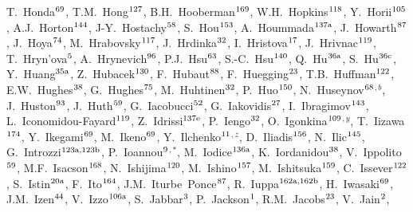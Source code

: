 \begin{flushleft}
T.~Honda$^\textrm{\scriptsize 69}$,
T.M.~Hong$^\textrm{\scriptsize 127}$,
B.H.~Hooberman$^\textrm{\scriptsize 169}$,
W.H.~Hopkins$^\textrm{\scriptsize 118}$,
Y.~Horii$^\textrm{\scriptsize 105}$,
A.J.~Horton$^\textrm{\scriptsize 144}$,
J-Y.~Hostachy$^\textrm{\scriptsize 58}$,
S.~Hou$^\textrm{\scriptsize 153}$,
A.~Hoummada$^\textrm{\scriptsize 137a}$,
J.~Howarth$^\textrm{\scriptsize 87}$,
J.~Hoya$^\textrm{\scriptsize 74}$,
M.~Hrabovsky$^\textrm{\scriptsize 117}$,
J.~Hrdinka$^\textrm{\scriptsize 32}$,
I.~Hristova$^\textrm{\scriptsize 17}$,
J.~Hrivnac$^\textrm{\scriptsize 119}$,
T.~Hryn'ova$^\textrm{\scriptsize 5}$,
A.~Hrynevich$^\textrm{\scriptsize 96}$,
P.J.~Hsu$^\textrm{\scriptsize 63}$,
S.-C.~Hsu$^\textrm{\scriptsize 140}$,
Q.~Hu$^\textrm{\scriptsize 36a}$,
S.~Hu$^\textrm{\scriptsize 36c}$,
Y.~Huang$^\textrm{\scriptsize 35a}$,
Z.~Hubacek$^\textrm{\scriptsize 130}$,
F.~Hubaut$^\textrm{\scriptsize 88}$,
F.~Huegging$^\textrm{\scriptsize 23}$,
T.B.~Huffman$^\textrm{\scriptsize 122}$,
E.W.~Hughes$^\textrm{\scriptsize 38}$,
G.~Hughes$^\textrm{\scriptsize 75}$,
M.~Huhtinen$^\textrm{\scriptsize 32}$,
P.~Huo$^\textrm{\scriptsize 150}$,
N.~Huseynov$^\textrm{\scriptsize 68}$$^{,b}$,
J.~Huston$^\textrm{\scriptsize 93}$,
J.~Huth$^\textrm{\scriptsize 59}$,
G.~Iacobucci$^\textrm{\scriptsize 52}$,
G.~Iakovidis$^\textrm{\scriptsize 27}$,
I.~Ibragimov$^\textrm{\scriptsize 143}$,
L.~Iconomidou-Fayard$^\textrm{\scriptsize 119}$,
Z.~Idrissi$^\textrm{\scriptsize 137e}$,
P.~Iengo$^\textrm{\scriptsize 32}$,
O.~Igonkina$^\textrm{\scriptsize 109}$$^{,y}$,
T.~Iizawa$^\textrm{\scriptsize 174}$,
Y.~Ikegami$^\textrm{\scriptsize 69}$,
M.~Ikeno$^\textrm{\scriptsize 69}$,
Y.~Ilchenko$^\textrm{\scriptsize 11}$$^{,z}$,
D.~Iliadis$^\textrm{\scriptsize 156}$,
N.~Ilic$^\textrm{\scriptsize 145}$,
G.~Introzzi$^\textrm{\scriptsize 123a,123b}$,
P.~Ioannou$^\textrm{\scriptsize 9}$$^{,*}$,
M.~Iodice$^\textrm{\scriptsize 136a}$,
K.~Iordanidou$^\textrm{\scriptsize 38}$,
V.~Ippolito$^\textrm{\scriptsize 59}$,
M.F.~Isacson$^\textrm{\scriptsize 168}$,
N.~Ishijima$^\textrm{\scriptsize 120}$,
M.~Ishino$^\textrm{\scriptsize 157}$,
M.~Ishitsuka$^\textrm{\scriptsize 159}$,
C.~Issever$^\textrm{\scriptsize 122}$,
S.~Istin$^\textrm{\scriptsize 20a}$,
F.~Ito$^\textrm{\scriptsize 164}$,
J.M.~Iturbe~Ponce$^\textrm{\scriptsize 87}$,
R.~Iuppa$^\textrm{\scriptsize 162a,162b}$,
H.~Iwasaki$^\textrm{\scriptsize 69}$,
J.M.~Izen$^\textrm{\scriptsize 44}$,
V.~Izzo$^\textrm{\scriptsize 106a}$,
S.~Jabbar$^\textrm{\scriptsize 3}$,
P.~Jackson$^\textrm{\scriptsize 1}$,
R.M.~Jacobs$^\textrm{\scriptsize 23}$,
V.~Jain$^\textrm{\scriptsize 2}$,

\end{flushleft}
